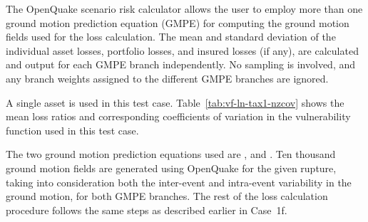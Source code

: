 The OpenQuake scenario risk calculator allows the user to employ more than one ground motion prediction equation (GMPE) for computing the ground motion fields used for the loss calculation. The mean and standard deviation of the individual asset losses, portfolio losses, and insured losses (if any), are calculated and output for each GMPE branch independently. No sampling is involved, and any branch weights assigned to the different GMPE branches are ignored.

A single asset is used in this test case. Table~\ref{tab:vf-ln-tax1-nzcov} shows the mean loss ratios and corresponding coefficients of variation in the vulnerability function used in this test case.

The two ground motion prediction equations used are \citet{boore2008}, and \citet{chiou2008}. Ten thousand ground motion fields are generated using OpenQuake for the given rupture, taking into consideration both the inter-event and intra-event variability in the ground motion, for both GMPE branches. The rest of the loss calculation procedure follows the same steps as described earlier in Case~1f.